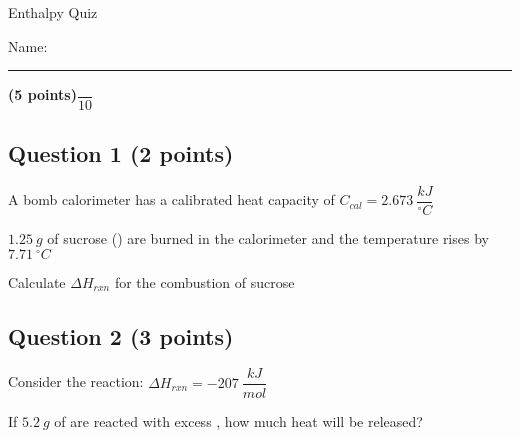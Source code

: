 \documentclass[12pt, letterpaper]{memoir}
\begin{document}
	\begin{center}
		{\large Enthalpy Quiz}
	\end{center}
	{\large Name: \rule[-1mm]{4in}{.1pt} {\bfseries (5 points)}\hspace{4em}$\dfrac{~}{10}$} 
	
	\subsection*{Question 1 (2 points)}
	A bomb calorimeter has a calibrated heat capacity of $C_{cal}=2.673~\dfrac{kJ}{^\circ C}$
	
	\noindent
	$1.25~g$ of sucrose () are burned in the calorimeter and the temperature rises by $7.71~^\circ C$
	
	\noindent
	Calculate $\Delta H_{rxn}$ for the combustion of sucrose
	
	
	\vspace{15em}
	\subsection*{Question 2 (3 points)}
	Consider the reaction:  \hspace{2em} $\Delta H_{rxn} = -207~\dfrac{kJ}{mol}$
	
	\noindent
	If $5.2~g$ of  are reacted with excess , how much heat will be released?
\end{document}
